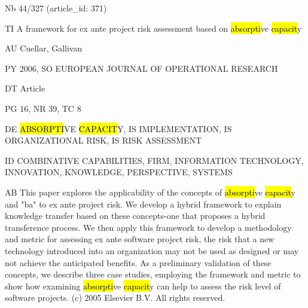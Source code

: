 \documentclass[a4paper]{article}
\begin{document}
\vspace*{-2cm}
Nb \tabto{0cm}44/327 (article\_id: 371)\par
TI \tabto{0cm}A framework for ex ante project risk assessment based on \hl{absorpti}ve \hl{capacit}y\par
AU \tabto{0cm}Cuellar, Gallivan\par
PY \tabto{0cm}2006, SO EUROPEAN JOURNAL OF OPERATIONAL RESEARCH\par
DT \tabto{0cm}Article\par
PG \tabto{0cm}16, NR 39, TC 8\par
DE \tabto{0cm}\hl{ABSORPTI}VE \hl{CAPACIT}Y, IS IMPLEMENTATION, IS ORGANIZATIONAL RISK, IS RISK ASSESSMENT\par
ID \tabto{0cm}COMBINATIVE CAPABILITIES, FIRM, INFORMATION TECHNOLOGY, INNOVATION, KNOWLEDGE, PERSPECTIVE, SYSTEMS\par
AB \tabto{0cm}This paper explores the applicability of the concepts of \hl{absorpti}ve \hl{capacit}y and "ba" to ex ante project risk. We develop a hybrid framework to explain knowledge transfer based on these concepts-one that proposes a hybrid transference process. We then apply this framework to develop a methodology and metric for assessing ex ante software project risk, the risk that a new technology introduced into an organization may not be used as designed or may not achieve the anticipated benefits. As a preliminary validation of these concepts, we describe three case studies, employing the framework and metric to show how examining \hl{absorpti}ve \hl{capacit}y can help to assess the risk level of software projects. (c) 2005 Elsevier B.V. All rights reserved.\par
\clearpage
\end{document}
